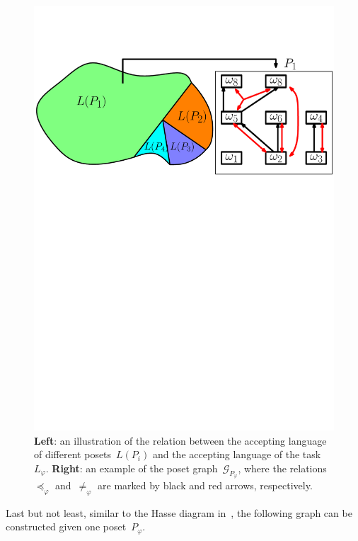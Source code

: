 \begin{figure}[t!]
	\includegraphics[width=0.9\linewidth]{figures/poset_language2.pdf}
	\centering
\caption{\textbf{Left}:
an illustration of the relation between the accepting
language of different posets~$L(P_i)$
and the accepting language of the task~$L_\varphi$.
\textbf{Right}:
an example of the poset graph~$\mathcal{G}_{P_\varphi}$,
where the relations~$\preceq_{\varphi}$ and~$\neq_{\varphi}$
are marked by black and red arrows, respectively.}
\label{fig:poset_language}
\end{figure}

Last but not least, similar to the Hasse diagram in~\cite{simovici2008mathematical},
the following graph can be constructed given one poset~$P_{\varphi}$.

